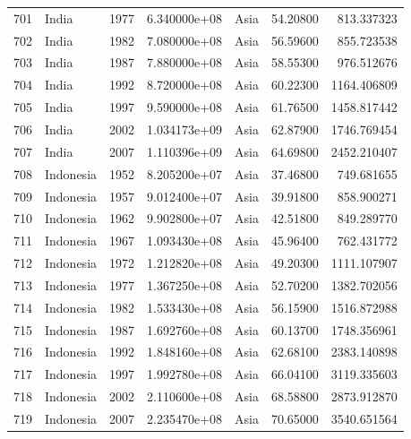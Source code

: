 \documentclass[
  letterpaper,
  DIV=11,
  numbers=noendperiod]{scrreprt}
\begin{document}
\begin{tabular}{llrrlrr}
701  &                     India &  1977 &  6.340000e+08 &      Asia &  54.20800 &     813.337323 \\
702  &                     India &  1982 &  7.080000e+08 &      Asia &  56.59600 &     855.723538 \\
703  &                     India &  1987 &  7.880000e+08 &      Asia &  58.55300 &     976.512676 \\
704  &                     India &  1992 &  8.720000e+08 &      Asia &  60.22300 &    1164.406809 \\
705  &                     India &  1997 &  9.590000e+08 &      Asia &  61.76500 &    1458.817442 \\
706  &                     India &  2002 &  1.034173e+09 &      Asia &  62.87900 &    1746.769454 \\
707  &                     India &  2007 &  1.110396e+09 &      Asia &  64.69800 &    2452.210407 \\
708  &                 Indonesia &  1952 &  8.205200e+07 &      Asia &  37.46800 &     749.681655 \\
709  &                 Indonesia &  1957 &  9.012400e+07 &      Asia &  39.91800 &     858.900271 \\
710  &                 Indonesia &  1962 &  9.902800e+07 &      Asia &  42.51800 &     849.289770 \\
711  &                 Indonesia &  1967 &  1.093430e+08 &      Asia &  45.96400 &     762.431772 \\
712  &                 Indonesia &  1972 &  1.212820e+08 &      Asia &  49.20300 &    1111.107907 \\
713  &                 Indonesia &  1977 &  1.367250e+08 &      Asia &  52.70200 &    1382.702056 \\
714  &                 Indonesia &  1982 &  1.533430e+08 &      Asia &  56.15900 &    1516.872988 \\
715  &                 Indonesia &  1987 &  1.692760e+08 &      Asia &  60.13700 &    1748.356961 \\
716  &                 Indonesia &  1992 &  1.848160e+08 &      Asia &  62.68100 &    2383.140898 \\
717  &                 Indonesia &  1997 &  1.992780e+08 &      Asia &  66.04100 &    3119.335603 \\
718  &                 Indonesia &  2002 &  2.110600e+08 &      Asia &  68.58800 &    2873.912870 \\
719  &                 Indonesia &  2007 &  2.235470e+08 &      Asia &  70.65000 &    3540.651564 \\

\end{tabular}
\end{document}
